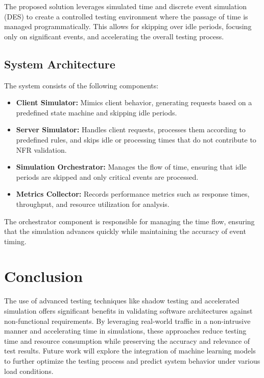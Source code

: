 The proposed solution leverages simulated time and discrete event simulation (DES) to create a controlled testing environment where the passage of time is managed programmatically. This allows for skipping over idle periods, focusing only on significant events, and accelerating the overall testing process.

\subsection{System Architecture}

The system consists of the following components:

\begin{itemize}
    \item \textbf{Client Simulator:} Mimics client behavior, generating requests based on a predefined state machine and skipping idle periods.
    \item \textbf{Server Simulator:} Handles client requests, processes them according to predefined rules, and skips idle or processing times that do not contribute to NFR validation.
    \item \textbf{Simulation Orchestrator:} Manages the flow of time, ensuring that idle periods are skipped and only critical events are processed.
    \item \textbf{Metrics Collector:} Records performance metrics such as response times, throughput, and resource utilization for analysis.
\end{itemize}

The orchestrator component is responsible for managing the time flow, ensuring that the simulation advances quickly while maintaining the accuracy of event timing.

\section{Conclusion}

The use of advanced testing techniques like shadow testing and accelerated simulation offers significant benefits in validating software architectures against non-functional requirements. By leveraging real-world traffic in a non-intrusive manner and accelerating time in simulations, these approaches reduce testing time and resource consumption while preserving the accuracy and relevance of test results. Future work will explore the integration of machine learning models to further optimize the testing process and predict system behavior under various load conditions.

